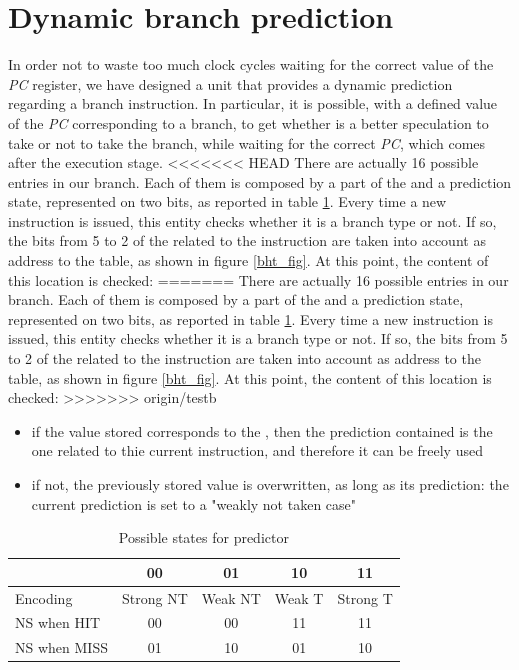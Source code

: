 \section{Dynamic branch prediction}
\label{dyn_br}
In order not to waste too much clock cycles waiting for the correct value of the \textit{PC} register, we have designed a unit that provides a dynamic prediction regarding a branch instruction. In particular, it is possible, with a defined value of the \textit{PC} corresponding to a branch, to get whether is a better speculation to take or not to take the branch, while waiting for the correct \textit{PC}, which comes after the execution stage. 
<<<<<<< HEAD
There are actually 16 possible entries in our branch. Each of them is composed by a part of the \pc and a prediction state, represented on two bits, as reported in table \ref{pred_tab}. Every time a new instruction is issued, this entity checks whether it is a branch type or not. If so, the bits from 5 to 2 of the \pc related to the instruction are taken into account as address to the table, as shown in figure \ref{bht_fig}. At this point, the content of this location is checked:
=======
There are actually 16 possible entries in our branch. Each of them is composed 
by a part of the \pc and a prediction state, represented on two bits, as 
reported in table \ref{pred_tab}. Every time a new instruction is issued, this 
entity checks whether it is a branch type or not. If so, the bits from 5 to 2 
of the \pc related to the instruction are taken into account as address to the 
table, as shown in figure \ref{bht_fig}. At this point, the content of this 
location is checked:
>>>>>>> origin/testb
\begin{itemize}
	\item if the value stored corresponds to the \pc, then the prediction contained is the one related to thie current instruction, and therefore it can be freely used
	\item if not, the previously stored value is overwritten, as long as its prediction: the current prediction is set to a "weakly not taken case"
\end{itemize}

\begin{table}[]
	\centering
	\begin{tabular}{l|cccc}
		\toprule
		& 00        & 01      & 10     & 11       \\
		\toprule
		Encoding     & Strong NT & Weak NT & Weak T & Strong T \\
		\midrule
		NS when HIT  & 00        & 00      & 11     & 11       \\
		NS when MISS & 01        & 10      & 01     & 10      	\\
		\bottomrule
	\end{tabular}
\caption{Possible states for predictor}
\label{pred_tab}
\end{table}


